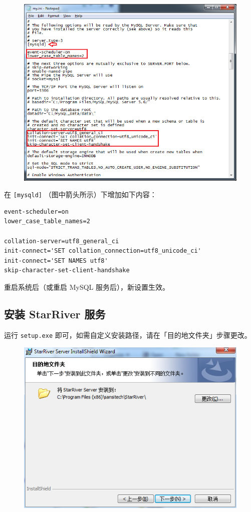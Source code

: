 \begin{figure}[htbp]
\centering
\includegraphics{img/my_ini.png}
\caption{}
\end{figure}

在 \texttt{{[}mysqld{]}} （图中箭头所示）下增加如下内容：

\begin{verbatim}
event-scheduler=on
lower_case_table_names=2

collation-server=utf8_general_ci
init-connect='SET collation_connection=utf8_unicode_ci'
init-connect='SET NAMES utf8'
skip-character-set-client-handshake
\end{verbatim}

重启系统后（或重启 MySQL 服务后），新设置生效。

\subsection{安装 StarRiver
服务}\label{ux5b89ux88c5-starriver-ux670dux52a1}

运行 \texttt{setup.exe}
即可，如需自定义安装路径，请在「目的地文件夹」步骤更改。

\begin{figure}[htbp]
\centering
\includegraphics{img/setup.png}
\caption{}
\end{figure}

